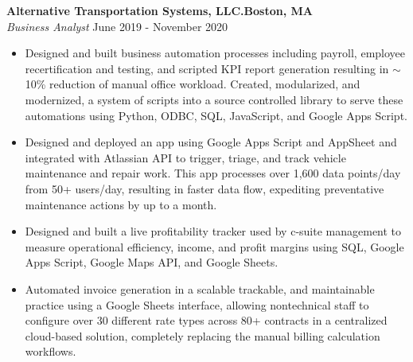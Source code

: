 \documentclass[a4paper]{article}
\begin{document}
\textbf{Alternative Transportation Systems, LLC.\hfill Boston, MA}\\
\textit{Business Analyst} \hfill June 2019 - November 2020\\
\vspace{-1mm}
\begin{itemize} \itemsep 1pt
	\item Designed and built business automation processes including payroll, employee recertification and testing, and scripted KPI report generation resulting in $\sim$10\% reduction of manual office workload. 
    Created, modularized, and modernized, a system of scripts into a source controlled library to serve these automations using Python, ODBC, SQL, JavaScript, and Google Apps Script.
	\item Designed and deployed an app using Google Apps Script and AppSheet and integrated with Atlassian API to trigger, triage, and track vehicle maintenance and repair work. This app processes over 1,600 data points/day from 50+ users/day, resulting in faster data flow, expediting preventative maintenance actions by up to a month.
	\item Designed and built a live profitability tracker used by c-suite management to measure operational efficiency, income, and profit margins using SQL, Google Apps Script, Google Maps API, and Google Sheets.
	\item Automated invoice generation in a scalable trackable, and maintainable practice using a Google Sheets interface, allowing nontechnical staff to configure over 30 different rate types across 80+ contracts in a centralized cloud-based solution, completely replacing the manual billing calculation workflows.
\end{itemize}
\end{document}
